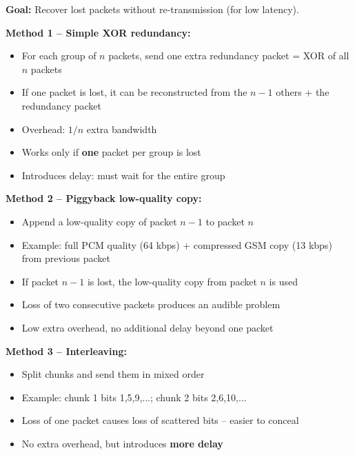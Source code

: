 \begin{tcolorbox}[keybox, title=FEC -- Forward Error Correction]
\textbf{Goal:} Recover lost packets without re-transmission (for low latency).

\medskip
\textbf{Method 1 -- Simple XOR redundancy:}
\begin{itemize}[nosep]
  \item For each group of $n$ packets, send one extra redundancy packet = XOR of all $n$ packets
  \item If one packet is lost, it can be reconstructed from the $n-1$ others + the redundancy packet
  \item Overhead: $1/n$ extra bandwidth
  \item Works only if \textbf{one} packet per group is lost
  \item Introduces delay: must wait for the entire group
\end{itemize}

\medskip
\textbf{Method 2 -- Piggyback low-quality copy:}
\begin{itemize}[nosep]
  \item Append a low-quality copy of packet $n-1$ to packet $n$
  \item Example: full PCM quality (64 kbps) + compressed GSM copy (13 kbps) from previous packet
  \item If packet $n-1$ is lost, the low-quality copy from packet $n$ is used
  \item Loss of two consecutive packets produces an audible problem
  \item Low extra overhead, no additional delay beyond one packet
\end{itemize}

\medskip
\textbf{Method 3 -- Interleaving:}
\begin{itemize}[nosep]
  \item Split chunks and send them in mixed order
  \item Example: chunk 1 bits 1,5,9,...; chunk 2 bits 2,6,10,...
  \item Loss of one packet causes loss of scattered bits -- easier to conceal
  \item No extra overhead, but introduces \textbf{more delay}
\end{itemize}
\end{tcolorbox}

\begin{imagebox}
\end{imagebox}

